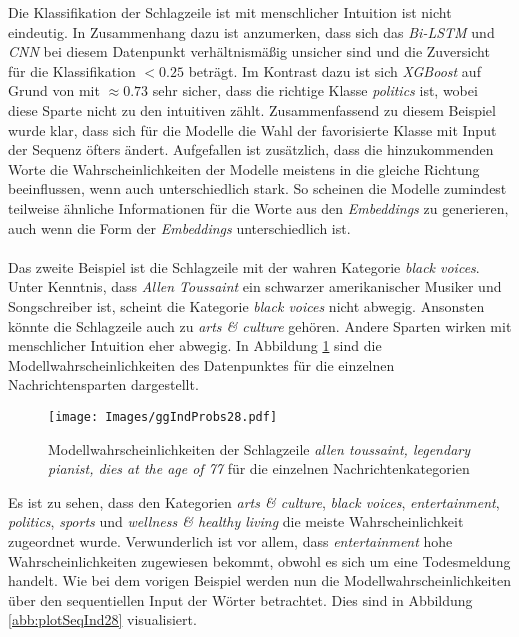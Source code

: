 \documentclass[a4paper,11pt]{article}
\begin{document}
Die Klassifikation der Schlagzeile ist mit menschlicher Intuition ist nicht eindeutig. In Zusammenhang dazu ist anzumerken, dass sich das \textit{Bi-LSTM} und \textit{CNN} bei diesem Datenpunkt verhältnismäßig unsicher sind und die Zuversicht für die Klassifikation $<  0.25$ beträgt. Im Kontrast dazu ist sich \textit{XGBoost} auf Grund von  mit $\approx 0.73$ sehr sicher, dass die richtige Klasse \textit{politics} ist, wobei diese Sparte nicht zu den intuitiven zählt. Zusammenfassend zu diesem Beispiel wurde klar, dass sich für die Modelle die Wahl der favorisierte Klasse mit Input der Sequenz öfters ändert. Aufgefallen ist zusätzlich, dass die hinzukommenden Worte die Wahrscheinlichkeiten der Modelle meistens in die gleiche Richtung beeinflussen, wenn auch unterschiedlich stark. So scheinen die Modelle zumindest teilweise ähnliche Informationen für die Worte aus den \textit{Embeddings} zu generieren, auch wenn die Form der \textit{Embeddings} unterschiedlich ist.\\
\\
Das zweite Beispiel ist die Schlagzeile  mit der wahren Kategorie \textit{black voices}. Unter Kenntnis, dass \textit{Allen Toussaint} ein schwarzer amerikanischer Musiker und Songschreiber ist, scheint die Kategorie \textit{black voices} nicht abwegig. Ansonsten könnte die Schlagzeile auch zu \textit{arts \& culture} gehören. Andere Sparten wirken mit menschlicher Intuition eher abwegig. In Abbildung \ref{abb:IndProbs28} sind die Modellwahrscheinlichkeiten des Datenpunktes für die einzelnen Nachrichtensparten dargestellt.

\begin{figure}[H]
    \centering
\texttt{[image: Images/ggIndProbs28.pdf]} 
\caption{Modellwahrscheinlichkeiten der Schlagzeile \textit{allen toussaint, legendary pianist, dies at the age of 77} für die einzelnen Nachrichtenkategorien}
\label{abb:IndProbs28}
\end{figure}

Es ist zu sehen, dass den Kategorien \textit{arts \& culture}, \textit{black voices}, \textit{entertainment}, \textit{politics}, \textit{sports} und \textit{wellness \& healthy living} die meiste Wahrscheinlichkeit zugeordnet wurde. Verwunderlich ist vor allem, dass \textit{entertainment} hohe Wahrscheinlichkeiten zugewiesen bekommt, obwohl es sich um eine Todesmeldung handelt. Wie bei dem vorigen Beispiel werden nun die Modellwahrscheinlichkeiten über den sequentiellen Input der Wörter betrachtet. Dies sind in Abbildung \ref{abb:plotSeqInd28} visualisiert.
\end{document}
